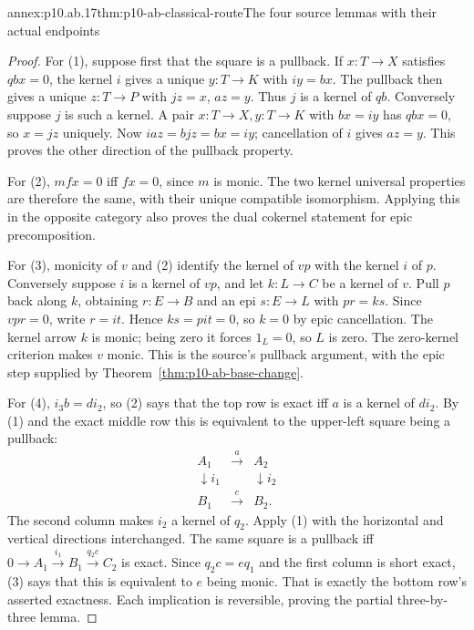 \begin{annexitem}{annex:p10.ab.17}{thm:p10-ab-classical-route}{The four source lemmas with their actual endpoints}
\begin{proof}
For (1), suppose first that the square is a pullback. If
\(x:T\to X\) satisfies \(qbx=0\), the kernel \(i\) gives a
unique \(y:T\to K\) with \(iy=bx\). The pullback then gives a
unique \(z:T\to P\) with \(jz=x\), \(az=y\). Thus \(j\)
is a kernel of \(qb\). Conversely suppose \(j\) is such a
kernel. A pair \(x:T\to X,y:T\to K\) with \(bx=iy\) has
\(qbx=0\), so \(x=jz\) uniquely. Now
\(iaz=bjz=bx=iy\); cancellation of \(i\) gives \(az=y\).
This proves the other direction of the pullback property.

For (2), \(mfx=0\) iff \(fx=0\), since \(m\) is monic.
The two kernel universal properties are therefore the same, with their
unique compatible isomorphism. Applying this in the opposite category
also proves the dual cokernel statement for epic precomposition.

For (3), monicity of \(v\) and (2) identify the kernel of \(vp\)
with the kernel \(i\) of \(p\). Conversely suppose \(i\) is a
kernel of \(vp\), and let \(k:L\to C\) be a kernel of \(v\).
Pull \(p\) back along \(k\), obtaining \(r:E\to B\) and an
epi \(s:E\to L\) with \(pr=ks\). Since \(vpr=0\), write
\(r=it\). Hence \(ks=pit=0\), so \(k=0\) by epic cancellation.
The kernel arrow \(k\) is monic; being zero it forces \(1_L=0\),
so \(L\) is zero. The zero-kernel criterion makes \(v\) monic.
This is the source's pullback argument, with the epic step supplied by
Theorem~\ref{thm:p10-ab-base-change}.

For (4), \(i_3b=di_2\), so (2) says that the top row is exact
iff \(a\) is a kernel of \(di_2\). By (1) and the exact middle
row this is equivalent to the upper-left square being a pullback:
\[
\begin{array}{ccc}
A_1&\xrightarrow a&A_2\\
\downarrow i_1&&\downarrow i_2\\
B_1&\xrightarrow c&B_2.
\end{array}
\]
The second column makes \(i_2\) a kernel of \(q_2\).
Apply (1) with the horizontal and vertical directions interchanged.
The same square is a pullback iff
\(0\to A_1\xrightarrow{i_1}B_1\xrightarrow{q_2c}C_2\)
is exact. Since \(q_2c=eq_1\) and the first column is short
exact, (3) says that this is equivalent to \(e\) being monic.
That is exactly the bottom row's asserted exactness. Each implication
is reversible, proving the partial three-by-three lemma.
\end{proof}
\end{annexitem}


